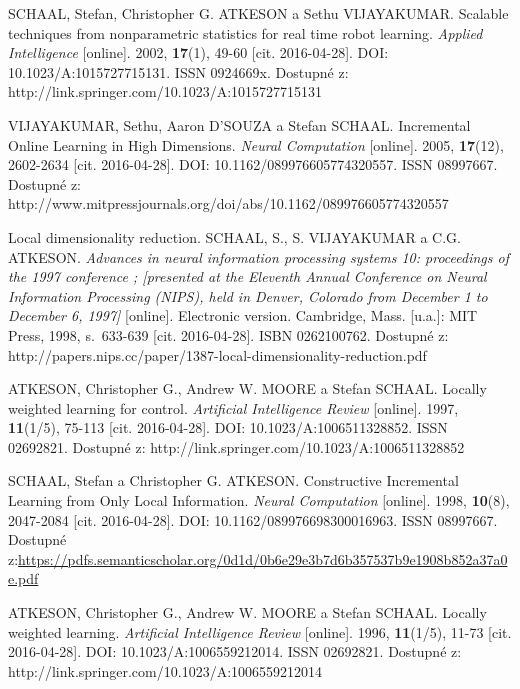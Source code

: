 \begin{thebibliography}{14}
	SCHAAL, Stefan, Christopher G. ATKESON a Sethu VIJAYAKUMAR. Scalable techniques from nonparametric statistics for real time robot learning. \textit{Applied Intelligence} [online]. 2002, \textbf{17}(1), 49-60 [cit. 2016-04-28]. DOI: 10.1023/A:1015727715131. ISSN 0924669x. Dostupné z: http://link.springer.com/10.1023/A:1015727715131
	
	VIJAYAKUMAR, Sethu, Aaron D'SOUZA a Stefan SCHAAL. Incremental Online Learning in High Dimensions. \textit{Neural Computation} [online]. 2005, \textbf{17}(12), 2602-2634 [cit. 2016-04-28]. DOI: 10.1162/089976605774320557. ISSN 08997667. Dostupné z: http://www.mitpressjournals.org/doi/abs/10.1162/089976605774320557
	
	Local dimensionality reduction. SCHAAL, S., S. VIJAYAKUMAR a C.G. ATKESON. \textit{Advances in neural information processing systems 10: proceedings of the 1997 conference ; [presented at the Eleventh Annual Conference on Neural Information Processing (NIPS), held in Denver, Colorado from December 1 to December 6, 1997]} [online]. Electronic version. Cambridge, Mass. [u.a.]: MIT Press, 1998, s.~633-639 [cit. 2016-04-28]. ISBN 0262100762. Dostupné z: http://papers.nips.cc/paper/1387-local-dimensionality-reduction.pdf
	
	ATKESON, Christopher G., Andrew W. MOORE a Stefan SCHAAL. Locally weighted learning for control. \textit{Artificial Intelligence Review} [online]. 1997, \textbf{11}(1/5), 75-113 [cit. 2016-04-28]. DOI: 10.1023/A:1006511328852. ISSN 02692821. Dostupné z: http://link.springer.com/10.1023/A:1006511328852
	
	SCHAAL, Stefan a Christopher G. ATKESON. Constructive Incremental Learning from Only Local Information. \textit{Neural Computation} [online]. 1998, \textbf{10}(8), 2047-2084 [cit. 2016-04-28]. DOI: 10.1162/089976698300016963. ISSN 08997667. Dostupné z:\url{https://pdfs.semanticscholar.org/0d1d/0b6e29e3b7d6b357537b9e1908b852a37a0e.pdf}
	
	ATKESON, Christopher G., Andrew W. MOORE a Stefan SCHAAL. Locally weighted learning. \textit{Artificial Intelligence Review} [online]. 1996, \textbf{11}(1/5), 11-73 [cit. 2016-04-28]. DOI: 10.1023/A:1006559212014. ISSN 02692821. Dostupné z: http://link.springer.com/10.1023/A:1006559212014
	
	
\end{thebibliography}
